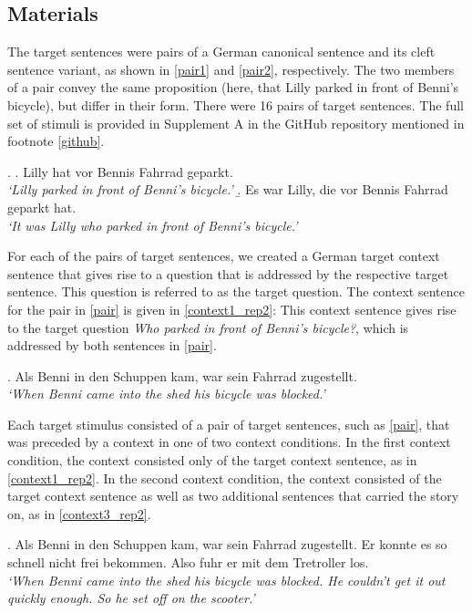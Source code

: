 \documentclass{salt}
\begin{document}
\subsection{Materials} 
\label{subsec:material}

The target sentences were pairs of a German canonical sentence and its cleft sentence variant, as shown in \ref{pair1} and \ref{pair2}, respectively. The two members of a pair convey the same proposition (here, that Lilly parked in front of Benni's bicycle), but differ in their form. There were 16 pairs of target sentences. The full set of stimuli is provided in Supplement A in the GitHub repository mentioned in footnote \ref{github}.


\ex.\label{pair} \a.\label{pair1} Lilly hat vor Bennis Fahrrad geparkt. \\
\textit{`Lilly parked in front of Benni's bicycle.'}
\b.\label{pair2} Es war Lilly, die vor Bennis Fahrrad geparkt hat.\\
\textit{`It was Lilly who parked in front of Benni's bicycle.'}

For each of the pairs of target sentences, we created a German target context sentence that gives rise to a question that is addressed by the respective target sentence. This question is referred to as the target question. The context sentence for the pair in \ref{pair} is given in \ref{context1_rep2}: This context sentence gives rise to the target question \textit{Who parked in front of Benni's bicycle?}, which is addressed by both sentences in \ref{pair}. 

\ex.\label{context1_rep2} Als Benni in den Schuppen kam, war sein Fahrrad zugestellt. \\ \textit{`When Benni came into the shed his bicycle was blocked.'}

Each target stimulus consisted of a pair of target sentences, such as \ref{pair}, that was preceded by a context in one of two context conditions. In the first context condition, the context consisted only of the target context sentence, as in \ref{context1_rep2}. In the second context condition, the context consisted of the target context sentence as well as two additional sentences that carried the story on, as in \ref{context3_rep2}. 

\ex.\label{context3_rep2} Als Benni in den Schuppen kam, war sein Fahrrad zugestellt. Er konnte es so schnell nicht frei bekommen. Also fuhr er mit dem Tretroller los.\\ \textit{`When Benni came into the shed his bicycle was blocked. He couldn't get it out quickly enough. So he set off on the scooter.'}
\end{document}
